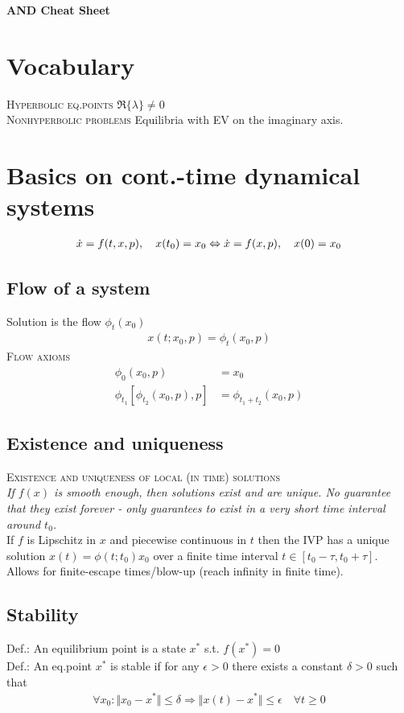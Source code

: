 \begin{center}
     \Large{\textbf{AND Cheat Sheet}} \\
\end{center}

\section{Vocabulary}
\textsc{Hyperbolic eq.points} $\Re\{\lambda\} \neq 0$ \\
\textsc{Nonhyperbolic problems} Equilibria with EV on the imaginary axis.

\section{Basics on cont.-time dynamical systems}
\begin{align*}
\dot{x} = f(t,x,p), \quad x(t_0) = x_0 \Leftrightarrow \dot{x} = f(x,p), \quad x(0)=x_0
\end{align*}
\subsection{Flow of a system}
Solution is the flow $\phi_t(x_0)$
\begin{align*}
x(t;x_0,p)=\phi_t(x_0,p)
\end{align*}
\textsc{Flow axioms}\\
\begin{align*}
\phi_0(x_0,p)&=x_0\\
\phi_{t_1}[\phi_{t_2}(x_0,p),p] &= \phi_{t_1+t_2}(x_0,p)
\end{align*}
\subsection{Existence and uniqueness}
\textsc{Existence and uniqueness of local (in time) solutions}\\
\emph{If $f(x)$ is smooth enough, then solutions exist and are unique. No guarantee that they exist forever - only guarantees to exist in a very short time interval around $t_0$.}\\
If $f$ is Lipschitz in $x$ and piecewise continuous in $t$ then the IVP has a unique solution $x(t)=\phi(t;t_0)x_0$ over a finite time interval $t\in[t_0-\tau,t_0+\tau]$.\\
Allows for finite-escape times/blow-up (reach infinity in finite time).

\subsection{Stability}
Def.: An equilibrium point is a state $x^*$ s.t. $f(x^*)=0$\\
Def.: An eq.point $x^*$ is stable if for any $\epsilon>0$ there exists a constant $\delta > 0$ such that \begin{align*}
\forall x_0: \Vert x_0 - x^* \Vert \leq \delta \Rightarrow \Vert x(t)-x^* \Vert \leq \epsilon \quad \forall t \geq 0
\end{align*}

